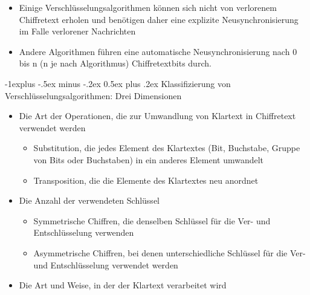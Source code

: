 \documentclass[a4paper]{article}
\makeatletter
\renewcommand{\subsection}{\@startsection{subsection}{2}{0mm}%
 {-1explus -.5ex minus -.2ex}%
 {0.5ex plus .2ex}%
 {\normalfont\normalsize\bfseries}}
\makeatother
\begin{document}
\begin{multicols}{3}
\begin{itemize}
              \begin{itemize}
                  \item
                        Einige Verschlüsselungsalgorithmen können sich nicht von verlorenem
                        Chiffretext erholen und benötigen daher eine explizite
                        Neusynchronisierung im Falle verlorener Nachrichten
                  \item
                        Andere Algorithmen führen eine automatische Neusynchronisierung nach
                        0 bis n (n je nach Algorithmus) Chiffretextbits durch.
              \end{itemize}
    \end{itemize}


    \subsection{Klassifizierung von Verschlüsselungsalgorithmen: Drei
        Dimensionen}

    \begin{itemize}
        \item
              Die Art der Operationen, die zur Umwandlung von Klartext in
              Chiffretext verwendet werden

              \begin{itemize}
                  \item
                        Substitution, die jedes Element des Klartextes (Bit, Buchstabe,
                        Gruppe von Bits oder Buchstaben) in ein anderes Element umwandelt
                  \item
                        Transposition, die die Elemente des Klartextes neu anordnet
              \end{itemize}
        \item
              Die Anzahl der verwendeten Schlüssel

              \begin{itemize}
                  \item
                        Symmetrische Chiffren, die denselben Schlüssel für die Ver- und
                        Entschlüsselung verwenden
                  \item
                        Asymmetrische Chiffren, bei denen unterschiedliche Schlüssel für die
                        Ver- und Entschlüsselung verwendet werden
              \end{itemize}
        \item
              Die Art und Weise, in der der Klartext verarbeitet wird


\end{itemize}
\end{multicols}
\end{document}

